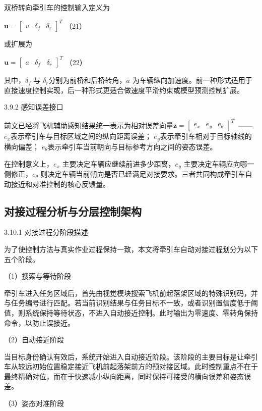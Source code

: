 双桥转向牵引车的控制输入定义为

\(\mathbf{u} = \begin{bmatrix}
v & \delta_{f} & \delta_{r}
\end{bmatrix}^{T}\) （21）

或扩展为

\(\mathbf{u} = \begin{bmatrix}
a & \delta_{f} & \delta_{r}
\end{bmatrix}^{T}\) （22）

其中，\(\delta_{f}\) 与 \(\delta_{r}\)分别为前桥和后桥转角，\(a\)
为车辆纵向加速度。前一种形式适用于直接速度控制实现，后一种形式更适合做速度平滑约束或模型预测控制扩展。

3.9.2 感知误差接口

前文已经将飞机辅助感知结果统一表示为相对误差向量\(\mathbf{z} = \begin{bmatrix}
e_{x} & e_{y} & e_{\theta}
\end{bmatrix}^{T}\)
\(\ \)------\(e_{x}\)表示牵引车与目标区域之间的纵向距离误差；
\(e_{y}\)表示牵引车相对于目标轴线的横向偏差；
\(e_{\theta}\)表示牵引车当前朝向与目标参考方向之间的姿态误差。

在控制意义上，\(e_{x}\) 主要决定车辆应继续前进多少距离，\(e_{y}\)
主要决定车辆应向哪一侧修正，\(e_{\theta}\)
则决定车辆当前朝向是否已经满足对接要求。三者共同构成牵引车自动接近和对准控制的核心反馈量。

\subsection{对接过程分析与分层控制架构}

3.10.1 对接过程分阶段描述

为了使控制方法与真实作业过程保持一致，本文将牵引车自动对接过程划分为以下五个阶段。

（1）搜索与等待阶段

牵引车进入任务区域后，首先由视觉模块搜索飞机前起落架区域的特殊识别码，并与任务编号进行匹配。若当前识别结果与任务目标不一致，或者识别置信度低于阈值，则系统保持等待状态，不进入自动接近控制。此时输出为零速度、零转角保持命令，以防止误接近。

（2）自动接近阶段

当目标身份确认有效后，系统开始进入自动接近阶段。该阶段的主要目标是让牵引车从较远初始位置稳定接近飞机前起落架前方的预对接区域。此时控制重点不在于最终精确对位，而在于快速减小纵向距离，同时保持可接受的横向误差和姿态误差。

（3）姿态对准阶段

